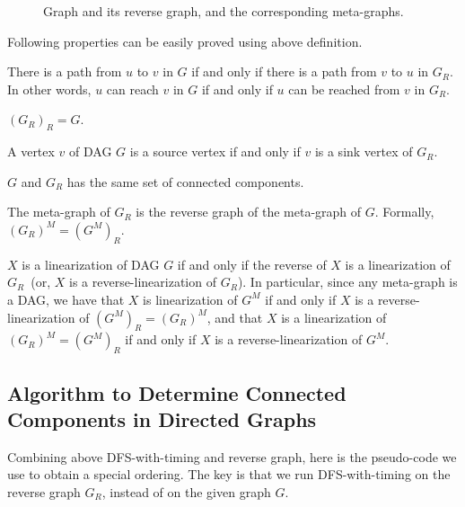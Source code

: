 \begin{figure}[h!]
\centering{}
\caption{Graph and its reverse graph, and the corresponding meta-graphs.}
\label{fig:reverse}
\end{figure}

Following properties can be easily proved using above definition.

\begin{property}
There is a path from $u$ to $v$ in $G$ if and only if there is a path from $v$ to $u$ in $G_R$.
In other words, $u$ can reach $v$ in $G$ if and only if $u$ can be reached from $v$ in $G_R$.
\end{property}

\begin{property}
$(G_R)_R = G$.
\end{property}

\begin{property}
A vertex $v$ of DAG $G$ is a source vertex if and only if $v$ is a sink vertex of $G_R$.
\end{property}


\begin{property}
$G$ and $G_R$ has the same set of connected components. %
\end{property}


\begin{property}
The meta-graph of $G_R$ is the reverse graph of the meta-graph of $G$. Formally, $(G_R)^M = (G^M)_R$.
\end{property}

\begin{property}
$X$ is a linearization of DAG $G$ if and only if the reverse of $X$ is a linearization of $G_R$~(or, $X$ is a reverse-linearization of $G_R$).
In particular, since any meta-graph is a DAG, we have that 
$X$ is linearization of $G^M$ if and only if $X$ is a reverse-linearization of $(G^M)_R = (G_R)^M$,
and that $X$ is a linearization of $(G_R)^M = (G^M)_R$ if and only if $X$ is a reverse-linearization of $G^M$.
\end{property}


\subsection*{Algorithm to Determine Connected Components in Directed Graphs}

Combining above DFS-with-timing and reverse graph, here is the pseudo-code we use to obtain a special ordering.
The key is that we run DFS-with-timing on the reverse graph $G_R$, instead of on the given graph $G$.

